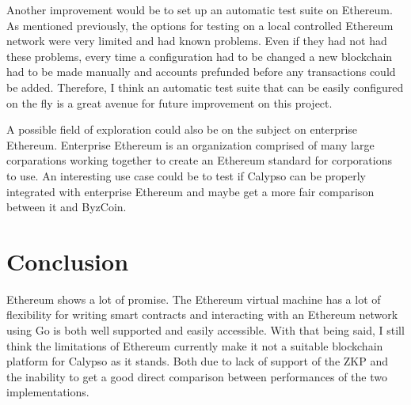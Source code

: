 \documentclass[12pt]{article}
\begin{document}
Another improvement would be to set up an automatic test suite on Ethereum. As mentioned previously, the options for testing on a local controlled Ethereum network were very limited and had known problems. Even if they had not had these problems, every time a configuration had to be changed a new blockchain had to be made manually and accounts prefunded before any transactions could be added. Therefore, I think an automatic test suite that can be easily configured on the fly is a great avenue for future improvement on this project.

A possible field of exploration could also be on the subject on enterprise Ethereum. Enterprise Ethereum is an organization comprised of many large corparations working together to create an Ethereum standard for corporations to use. An interesting use case could be to test if Calypso can be properly integrated with enterprise Ethereum and maybe get a more fair comparison between it and ByzCoin.

\section{Conclusion}

Ethereum shows a lot of promise. The Ethereum virtual machine has a lot of flexibility for writing smart contracts and interacting with an Ethereum network using Go is both well supported and easily accessible. With that being said, I still think the limitations of Ethereum currently make it not a suitable blockchain platform for Calypso as it stands. Both due to lack of support of the ZKP and the inability to get a good direct comparison between performances of the two implementations.


\newpage


\end{document}
